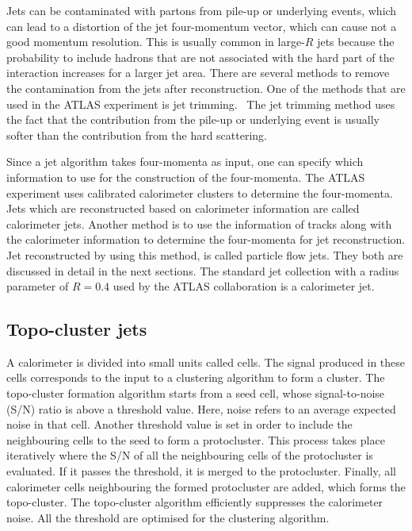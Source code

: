 Jets can be contaminated with partons from pile-up or underlying events, which can lead to a distortion of the jet four-momentum vector, which can cause not a good momentum resolution. This is usually common in large-$R$ jets because the probability to include hadrons that are not associated with the hard part of the interaction increases for a larger jet area. There are several methods to remove the contamination from the jets after reconstruction. One of the methods that are used in the ATLAS experiment is jet trimming.~\cite{jet_trimming} The jet trimming method uses the fact that the contribution from the pile-up or underlying event is usually softer than the contribution from the hard scattering.~\cite{thesis:ruth} 

Since a jet algorithm takes four-momenta as input, one can specify which information to use for the construction of the four-momenta. The ATLAS experiment uses calibrated calorimeter clusters to determine the four-momenta. Jets which are reconstructed based on calorimeter information are called calorimeter jets. Another method is to use the information of tracks along with the calorimeter information to determine the four-momenta for jet reconstruction. Jet reconstructed by using this method, is called particle flow jets. They both are discussed in detail in the next sections. The standard jet collection with a radius parameter of $R=0.4$ used by the ATLAS collaboration is a calorimeter jet.~\cite{thesis:ruth}

\subsection{Topo-cluster jets}
\label{sec:jetsandtaggers:jets:topo}
A calorimeter is divided into small units called cells. The signal produced in these cells corresponds to the input to a clustering algorithm to form a cluster. The topo-cluster formation algorithm starts from a seed cell, whose signal-to-noise (S/N) ratio is above a threshold value. Here, noise refers to an average expected noise in that cell. Another threshold value is set in order to include the neighbouring cells to the seed to form a protocluster. This process takes place iteratively where the S/N of all the neighbouring cells of the protocluster is evaluated. If it passes the threshold, it is merged to the protocluster. Finally, all calorimeter cells neighbouring the formed protocluster are added, which forms the topo-cluster. The topo-cluster algorithm efficiently suppresses the calorimeter noise. All the threshold are optimised for the clustering algorithm.~\cite{thesis:tanja}


